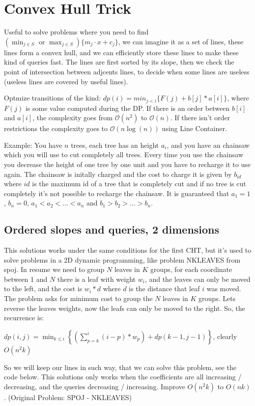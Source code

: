 \section{Convex Hull Trick}

Useful to solve problems where you need to find $\displaystyle (\min_{j\in S} \text{ or }\max_{j \in S})\{m_j \cdot x + c_j\}$, we can imagine it as a set of lines, these lines form a convex hull, and we can efficiently store these lines to make these kind of queries fast. The lines are first sorted by its slope, then we check the point of intersection between adjcents lines, to decide when some lines are useless (useless lines are covered by useful lines). 

Optmize transitions of the kind: $dp(i) = min_{j<i}\{F(j) + b[j] * a[i]\}$, where $F(j)$ is some value computed during the DP. If there is an order between $b[i]$ and $a[i]$, the complexity goes from $\mathcal{O}(n^2)$ to $\mathcal{O}(n)$. If there isn't order restrictions the complexity goes to $\mathcal{O}(n\log(n))$ using Line Container.

Example: You have $n$ trees, each tree has an height $a_i$, and you have an chainsaw which you will use to cut completely all trees. Every time you use the chainsaw you decrease the height of one tree by one unit and you have to recharge it to use again. The chainsaw is initally charged and the cost to charge it is given by $b_{id}$ where $id$ is the maximum id of a tree that is completely cut and if no tree is cut completely it's not possible to recharge the chainsaw. It is guaranteed that $a_1 = 1$, $b_n = 0$, $a_1 < a_2 < \dots < a_n$ and $b_1 > b_2 > \dots > b_n$.

\subsection{Ordered slopes and queries, 2 dimensions}

This solutions works under the same conditions for the first CHT, but it's used to solve problems in a 2D dynamic programming, like problem NKLEAVES from spoj. In resume we need to group $N$ leaves in $K$ groups, for each coordinate between 1 and $N$ there is a leaf with weight $w_i$, and the leaves can only be moved to the left, and the cost is $w_i * d$ where $d$ is the distance that leaf $i$ was moved. The problem asks for minimum cost to group the $N$ leaves in $K$ groups. Lets reverse the leaves weights, now the leafs can only be moved to the right. So, the recurrence is:

\bigskip

$dp(i, j) = \min_{k \leq i} \left\{ \left(\sum_{p=k}^{i} (i - p) * w_p \right) + dp(k - 1, j - 1)\right \}$, clearly $O(n^2k)$

\bigskip

So we will keep our lines in such way, that we can solve this problem, see the code below. This solutions only works when the coefficients are all increasing / decreasing, and the queries decreasing / increasing. Improve $O(n^2k)$ to $O(nk)$. (Original Problem: SPOJ - NKLEAVES)
